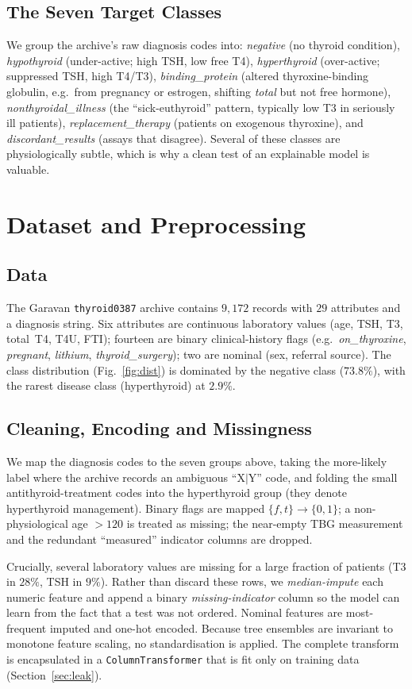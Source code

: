 \documentclass[conference]{IEEEtran}
\begin{document}
\subsection{The Seven Target Classes}
We group the archive's raw diagnosis codes into: \textit{negative} (no thyroid
condition), \textit{hypothyroid} (under-active; high TSH, low free T4),
\textit{hyperthyroid} (over-active; suppressed TSH, high T4/T3),
\textit{binding\_protein} (altered thyroxine-binding globulin, e.g.\ from
pregnancy or estrogen, shifting \emph{total} but not free hormone),
\textit{nonthyroidal\_illness} (the ``sick-euthyroid'' pattern, typically low T3
in seriously ill patients), \textit{replacement\_therapy} (patients on exogenous
thyroxine), and \textit{discordant\_results} (assays that disagree). Several of
these classes are physiologically subtle, which is why a clean test of an
explainable model is valuable.

\section{Dataset and Preprocessing}
\subsection{Data}
The Garavan \texttt{thyroid0387} archive contains $9{,}172$ records with $29$
attributes and a diagnosis string. Six attributes are continuous laboratory
values (age, TSH, T3, total~T4, T4U, FTI); fourteen are binary clinical-history
flags (e.g.\ \textit{on\_thyroxine}, \textit{pregnant}, \textit{lithium},
\textit{thyroid\_surgery}); two are nominal (sex, referral source). The class
distribution (Fig.~\ref{fig:dist}) is dominated by the negative class
($73.8\%$), with the rarest disease class (hyperthyroid) at $2.9\%$.

\subsection{Cleaning, Encoding and Missingness}
We map the diagnosis codes to the seven groups above, taking the more-likely label
where the archive records an ambiguous ``X$\mid$Y'' code, and folding the small
antithyroid-treatment codes into the hyperthyroid group (they denote hyperthyroid
management). Binary flags are mapped $\{f,t\}\!\to\!\{0,1\}$; a non-physiological
age ${>}120$ is treated as missing; the near-empty TBG measurement and the
redundant ``measured'' indicator columns are dropped.

Crucially, several laboratory values are missing for a large fraction of patients
(T3 in $28\%$, TSH in $9\%$). Rather than discard these rows, we
\emph{median-impute} each numeric feature and append a binary
\emph{missing-indicator} column so the model can learn from the fact that a test
was not ordered. Nominal features are most-frequent imputed and one-hot encoded.
Because tree ensembles are invariant to monotone feature scaling, no
standardisation is applied. The complete transform is encapsulated in a
\texttt{ColumnTransformer} that is fit only on training data (Section~\ref{sec:leak}).
\end{document}
